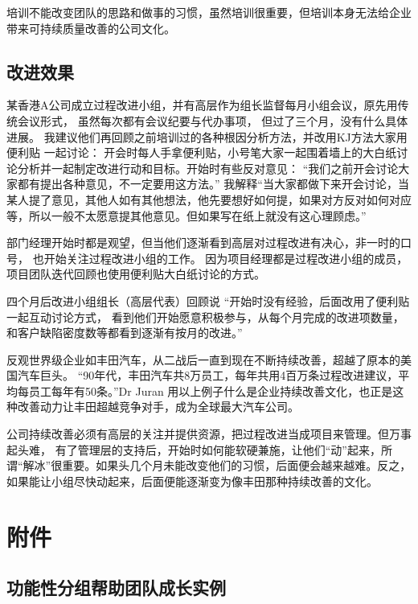 \documentclass{book}        %
\begin{document}
培训不能改变团队的思路和做事的习惯，虽然培训很重要，但培训本身无法给企业带来可持续质量改善的公司文化。

\hypertarget{ux6539ux8fdbux6548ux679c}{%
\subsection{改进效果}\label{ux6539ux8fdbux6548ux679c}}

某香港A公司成立过程改进小组，并有高层作为组长监督每月小组会议，原先用传统会议形式，
虽然每次都有会议纪要与代办事项， 但过了三个月，没有什么具体进展。
我建议他们再回顾之前培训过的各种根因分析方法，并改用KJ方法大家用便利贴
一起讨论：
开会时每人手拿便利贴，小号笔大家一起围着墙上的大白纸讨论分析并一起制定改进行动和目标。开始时有些反对意见：
``我们之前开会讨论大家都有提出各种意见，不一定要用这方法。''
我解释``当大家都做下来开会讨论，当某人提了意见，其他人如有其他想法，他先要想好如何提，如果对方反对如何对应等，所以一般不太愿意提其他意见。但如果写在纸上就没有这心理顾虑。''

部门经理开始时都是观望，但当他们逐渐看到高层对过程改进有决心，非一时的口号，
也开始关注过程改进小组的工作。 因为项目经理都是过程改进小组的成员，
项目团队迭代回顾也使用便利贴大白纸讨论的方式。

四个月后改进小组组长（高层代表）回顾说
``开始时没有经验，后面改用了便利贴一起互动讨论方式，
看到他们开始愿意积极参与，从每个月完成的改进项数量，
和客户缺陷密度数等都看到逐渐有按月的改进。''

反观世界级企业如丰田汽车，从二战后一直到现在不断持续改善，超越了原本的美国汽车巨头。
``90年代，丰田汽车共8万员工，每年共用4百万条过程改进建议，平均每员工每年有50条。''Dr
Juran
用以上例子什么是企业持续改善文化，也正是这种改善动力让丰田超越竞争对手，成为全球最大汽车公司。

公司持续改善必须有高层的关注并提供资源，把过程改进当成项目来管理。但万事起头难，
有了管理层的支持后，开始时如何能软硬兼施，让他们``动''起来，所谓``解冰''很重要。如果头几个月未能改变他们的习惯，后面便会越来越难。反之，如果能让小组尽快动起来，后面便能逐渐变为像丰田那种持续改善的文化。

\hypertarget{ux9644ux4ef6}{%
\section{附件}\label{ux9644ux4ef6}}

\hypertarget{ux529fux80fdux6027ux5206ux7ec4ux5e2eux52a9ux56e2ux961fux6210ux957fux5b9eux4f8b}{%
\subsection{功能性分组帮助团队成长实例}\label{ux529fux80fdux6027ux5206ux7ec4ux5e2eux52a9ux56e2ux961fux6210ux957fux5b9eux4f8b}}
\end{document}
